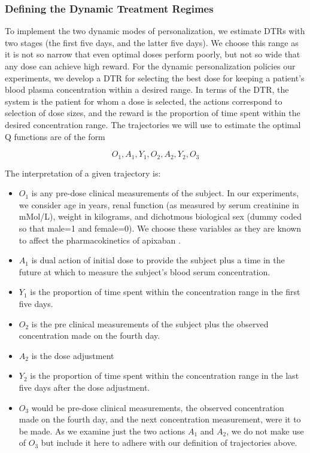 \subsubsection{Defining the Dynamic Treatment Regimes}

To implement the two dynamic modes of personalization, we estimate DTRs with two stages (the first five days, and the latter five days). We choose this range as it is not so narrow that even optimal doses perform poorly, but not so wide that any dose can achieve high reward. For the dynamic personalization policies our experiments, we develop a DTR for selecting the best dose for keeping a patient’s blood plasma concentration within a desired range.  In terms of the DTR, the system is the patient for whom a dose is selected, the actions correspond to selection of dose sizes, and the reward is the proportion of time spent within the desired concentration range. The trajectories we will use to estimate the optimal Q functions are of the form

\begin{equation}\label{key}
O_1, A_1, Y_1, O_2, A_2, Y_2, O_3
\end{equation}

\noindent The interpretation of a given trajectory is:
\begin{itemize}
	\item $ O_1 $ is any pre-dose clinical measurements of the subject.  In our experiments, we consider age in years, renal function (as measured by serum creatinine in mMol/L), weight in kilograms, and dichotmous biological sex (dummy coded so that male=1 and female=0).  We choose these variables as they are known to affect the pharmacokinetics of apixaban \cite{byon2019apixaban}.  
	\item $ A_1 $ is dual action of initial dose to provide the subject plus a time in the future at which to measure the subject’s blood serum concentration.
	\item $ Y_1 $ is the proportion of time spent within the concentration range in the first five days.
	\item $ O_2 $ is the pre clinical measurements of the subject plus the observed concentration made on the fourth day.
	\item $ A_2 $ is the dose adjustment
	\item $ Y_2 $ is the proportion of time spent within the concentration range in the last five days after the dose adjustment.
	\item $ O_3 $ would be pre-dose clinical measurements, the observed concentration made on the fourth day, and the next concentration measurement, were it to be made. As we examine just the two actions $ A_1 $ and $ A_2 $, we do not make use of $ O_3 $ but include it here to adhere with our definition of trajectories above.
\end{itemize}

